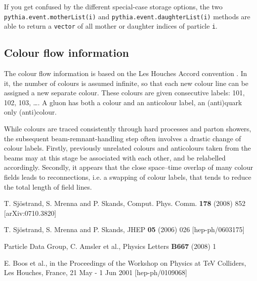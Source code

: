 \documentclass[12pt,a4paper]{article}
\begin{document}
If you get confused by the different special-case storage options, the 
two \texttt{pythia.event.motherList(i)} and
\texttt{pythia.event.daughterList(i)} methods are able to return a
\texttt{vector} of all mother or daughter indices of particle
\texttt{i}.

\subsection{Colour flow information}

The colour flow information is based on the Les Houches Accord
convention \cite{leshouchesaccord}. In it, the number of colours
is assumed infinite, so that each new colour line can be assigned
a new separate colour. These colours are given consecutive labels:
101, 102, 103, \ldots . A gluon has both a colour and an anticolour
label, an (anti)quark only (anti)colour. 

While colours are traced consistently through hard processes and 
parton showers, the subsequent beam-remnant-handling step often 
involves a drastic change of colour labels. Firstly, previously 
unrelated colours and anticolours taken from the beams may at this
stage be associated with each other, and be relabelled accordingly. 
Secondly, it appears that the close space--time overlap of many 
colour fields leads to reconnections, i.e. a swapping of colour labels, 
that tends to reduce the total length of field lines.

\begin{thebibliography}{99}

T. Sj\"ostrand, S. Mrenna and P. Skands,
Comput. Phys. Comm. {\bf 178} (2008) 852 [arXiv:0710.3820] 

T. Sj\"ostrand, S. Mrenna and P. Skands, 
JHEP {\bf 05} (2006) 026 [hep-ph/0603175]

Particle Data Group, C. Amsler et al., 
Physics Letters {\bf B667} (2008) 1

E. Boos et al., in the Proceedings of the Workshop on Physics at TeV 
Colliders, Les Houches, France, 21 May - 1 Jun 2001 [hep-ph/0109068]

\end{thebibliography}
\end{document}

